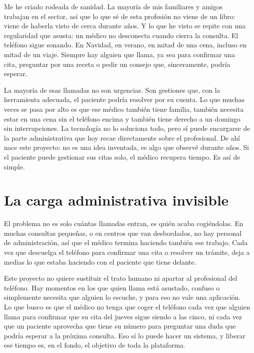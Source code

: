 \documentclass[12pt,a4paper]{report}
\begin{document}
Me he criado rodeada de sanidad. La mayoría de mis familiares y amigos trabajan en el sector, así que lo que sé de esta profesión no viene de un libro: viene de haberla visto de cerca durante años. Y lo que he visto se repite con una regularidad que asusta: un médico no desconecta cuando cierra la consulta. El teléfono sigue sonando. En Navidad, en verano, en mitad de una cena, incluso en mitad de un viaje. Siempre hay alguien que llama, ya sea para confirmar una cita, preguntar por una receta o pedir un consejo que, sinceramente, podría esperar.

La mayoría de esas llamadas no son urgencias. Son gestiones que, con la herramienta adecuada, el paciente podría resolver por su cuenta. Lo que muchas veces se pasa por alto es que ese médico también tiene familia, también necesita estar en una cena sin el teléfono encima y también tiene derecho a un domingo sin interrupciones. La tecnología no lo soluciona todo, pero sí puede encargarse de la parte administrativa que hoy recae directamente sobre el profesional. De ahí nace este proyecto: no es una idea inventada, es algo que observé durante años. Si el paciente puede gestionar sus citas solo, el médico recupera tiempo. Es así de simple.

\section{La carga administrativa invisible}

El problema no es solo cuántas llamadas entran, es quién acaba cogiéndolas. En muchas consultas pequeñas, o en centros que van desbordados, no hay personal de administración, así que el médico termina haciendo también ese trabajo. Cada vez que descuelga el teléfono para confirmar una cita o resolver un trámite, deja a medias lo que estaba haciendo con el paciente que tiene delante.

Este proyecto no quiere sustituir el trato humano ni apartar al profesional del teléfono. Hay momentos en los que quien llama está asustado, confuso o simplemente necesita que alguien lo escuche, y para eso no vale una aplicación. Lo que busco es que el médico no tenga que coger el teléfono cada vez que alguien llama para confirmar que su cita del jueves sigue siendo a las cinco, ni cada vez que un paciente aprovecha que tiene su número para preguntar una duda que podría esperar a la próxima consulta. Eso sí lo puede hacer un sistema, y liberar ese tiempo es, en el fondo, el objetivo de toda la plataforma.
\end{document}
